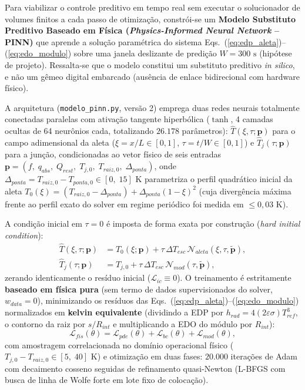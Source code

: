 Para viabilizar o controle preditivo em tempo real sem executar o solucionador de volumes finitos a cada passo de otimização, constrói-se um \textbf{Modelo Substituto Preditivo Baseado em Física (\textit{Physics-Informed Neural Network} -- PINN)} que aprende a solução paramétrica do sistema Eqs.~(\ref{eq:edp_aleta})--(\ref{eq:edo_modulo}) sobre uma janela deslizante de predição $W = 300\text{ s}$ (hipótese de projeto). Ressalta-se que o modelo constitui um substituto preditivo \textit{in silico}, e não um gêmeo digital embarcado (ausência de enlace bidirecional com hardware físico).

A arquitetura (\texttt{modelo\_pinn.py}, versão 2) emprega duas redes neurais totalmente conectadas paralelas com ativação tangente hiperbólica ($\tanh$, 4 camadas ocultas de 64 neurônios cada, totalizando $26.178$ parâmetros): $\hat{T}(\xi, \tau; \mathbf{p})$ para o campo adimensional da aleta ($\xi = x/L \in [0,1]$, $\tau = t/W \in [0,1]$) e $\hat{T}_j(\tau; \mathbf{p})$ para a junção, condicionadas ao vetor físico de seis entradas $\mathbf{p} = (f,\; q_{abs},\; Q_{rest},\; T_{j,0},\; T_{raiz,0},\; \Delta_{ponta})$, onde $\Delta_{ponta} = T_{raiz,0} - T_{ponta,0} \in [0,\; 15]\text{ K}$ parametriza o perfil quadrático inicial da aleta $T_0(\xi) = (T_{raiz,0} - \Delta_{ponta}) + \Delta_{ponta}(1 - \xi)^2$ (cuja divergência máxima frente ao perfil exato do solver em regime periódico foi medida em $\le 0{,}03\text{ K}$).

A condição inicial em $\tau = 0$ é imposta de forma exata por construção (\textit{hard initial condition}):
\begin{align}
    \hat{T}(\xi, \tau; \mathbf{p}) &= T_0(\xi; \mathbf{p}) + \tau\,\Delta T_{esc}\,\mathcal{N}_{aleta}(\xi, \tau, \tilde{\mathbf{p}}), \nonumber \\
    \hat{T}_j(\tau; \mathbf{p}) &= T_{j,0} + \tau\,\Delta T_{esc}\,\mathcal{N}_{mod}(\tau, \tilde{\mathbf{p}}),
    \label{eq:pinn_hard_ic}
\end{align}
zerando identicamente o resíduo inicial ($\mathcal{L}_{ic} \equiv 0$). O treinamento é estritamente \textbf{baseado em física pura} (sem termo de dados supervisionados do solver, $w_{data} = 0$), minimizando os resíduos das Eqs.~(\ref{eq:edp_aleta})--(\ref{eq:edo_modulo}) normalizados em \textbf{kelvin equivalente} (dividindo a EDP por $h_{rad} = 4(2\varepsilon\sigma)T_{ref}^3$, o contorno da raiz por $s/R_{int}$ e multiplicando a EDO do módulo por $R_{int}$):
\begin{equation}
    \mathcal{L}_{fis}(\theta) = \mathcal{L}_{pde}(\theta) + \mathcal{L}_{bc}(\theta) + \mathcal{L}_{mod}(\theta),
    \label{eq:pinn_loss_keq}
\end{equation}
com amostragem correlacionada no domínio operacional físico ($T_{j,0} - T_{raiz,0} \in [5,\; 40]\text{ K}$) e otimização em duas fases: $20.000$ iterações de Adam com decaimento cosseno seguidas de refinamento quasi-Newton (L-BFGS com busca de linha de Wolfe forte em lote fixo de colocação).


